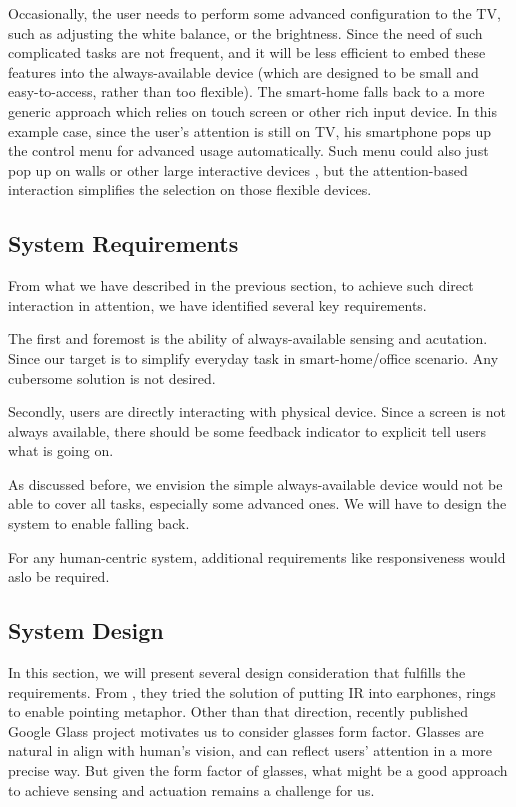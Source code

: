 Occasionally, the user needs to perform some advanced configuration to the TV, such as adjusting the white balance, or the brightness. Since the need of such complicated tasks are not frequent, and it will be less efficient to embed these features into the always-available device (which are designed to be small and easy-to-access, rather than too flexible). The smart-home falls back to a more generic approach which relies on touch screen or other rich input device. In this example case, since the user's attention is still on TV, his smartphone pops up the control menu for advanced usage automatically. Such menu could also just pop up on walls or other large interactive devices \cite{unPad:eWallpaper, MSVision}, but the attention-based interaction simplifies the selection on those flexible devices.

\subsection{System Requirements}
\label{sec:system-requirements}

From what we have described in the previous section, to achieve such direct interaction in attention, we have identified several key requirements.

The first and foremost is the ability of always-available sensing and acutation. Since our target is to simplify everyday task in smart-home/office scenario. Any cubersome solution is not desired.

Secondly, users are directly interacting with physical device. Since a screen is not always available, there should be some feedback indicator to explicit tell users what is going on.

As discussed before, we envision the simple always-available device would not be able to cover all tasks, especially some advanced ones. We will have to design the system to enable falling back.

For any human-centric system, additional requirements like responsiveness would aslo be required. 

\subsection{System Design}
\label{sec:system-design}

In this section, we will present several design consideration that fulfills the requirements. From \cite{Merrill:2007:ALP:1758156.1758158}, they tried the solution of putting IR into earphones, rings to enable pointing metaphor. Other than that direction, recently published Google Glass project motivates us to consider glasses form factor. Glasses are natural in align with human's vision, and can reflect users' attention in a more precise way. But given the form factor of glasses, what might be a good approach to achieve sensing and actuation remains a challenge for us.

